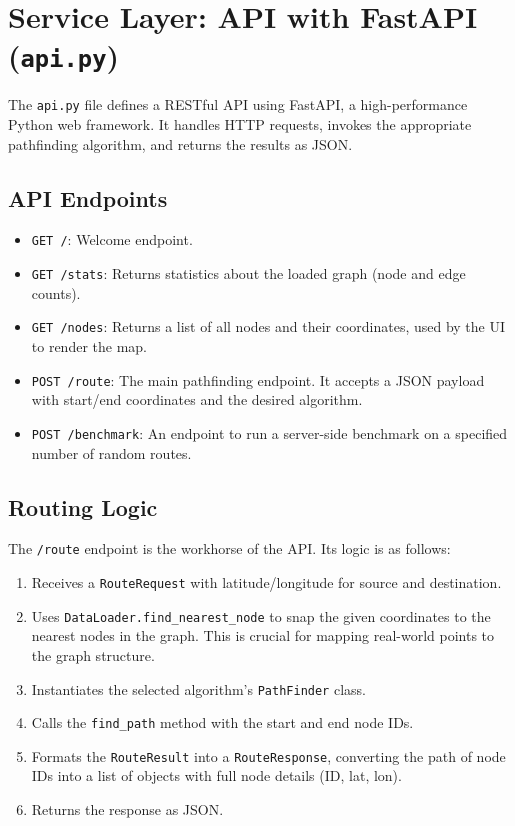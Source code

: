 \documentclass[12pt, a4paper]{report}
\begin{document}
\section{Service Layer: API with FastAPI (\texttt{api.py})}

The \texttt{api.py} file defines a RESTful API using FastAPI, a high-performance Python web framework. It handles HTTP requests, invokes the appropriate pathfinding algorithm, and returns the results as JSON.

\subsection{API Endpoints}
\begin{itemize}
    \item \texttt{GET /}: Welcome endpoint.
    \item \texttt{GET /stats}: Returns statistics about the loaded graph (node and edge counts).
    \item \texttt{GET /nodes}: Returns a list of all nodes and their coordinates, used by the UI to render the map.
    \item \texttt{POST /route}: The main pathfinding endpoint. It accepts a JSON payload with start/end coordinates and the desired algorithm.
    \item \texttt{POST /benchmark}: An endpoint to run a server-side benchmark on a specified number of random routes.
\end{itemize}

\subsection{Routing Logic}
The \texttt{/route} endpoint is the workhorse of the API. Its logic is as follows:
\begin{enumerate}
    \item Receives a \texttt{RouteRequest} with latitude/longitude for source and destination.
    \item Uses \texttt{DataLoader.find\_nearest\_node} to snap the given coordinates to the nearest nodes in the graph. This is crucial for mapping real-world points to the graph structure.
    \item Instantiates the selected algorithm's \texttt{PathFinder} class.
    \item Calls the \texttt{find\_path} method with the start and end node IDs.
    \item Formats the \texttt{RouteResult} into a \texttt{RouteResponse}, converting the path of node IDs into a list of objects with full node details (ID, lat, lon).
    \item Returns the response as JSON.
\end{enumerate}
\end{document}
